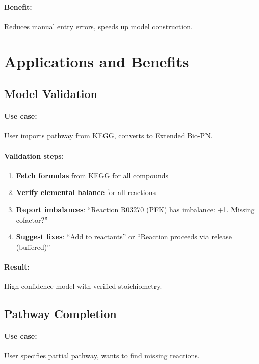 \paragraph{Benefit:} Reduces manual entry errors, speeds up model construction.

\section{Applications and Benefits}
\label{sec:formula-applications}

\subsection{Model Validation}
\label{subsec:model-validation}

\paragraph{Use case:} User imports pathway from KEGG, converts to Extended Bio-PN.

\paragraph{Validation steps:}
\begin{enumerate}
    \item \textbf{Fetch formulas} from KEGG for all compounds
    \item \textbf{Verify elemental balance} for all reactions
    \item \textbf{Report imbalances}: ``Reaction R03270 (PFK) has  imbalance: +1. Missing cofactor?''
    \item \textbf{Suggest fixes}: ``Add  to reactants'' or ``Reaction proceeds via  release (buffered)''
\end{enumerate}

\paragraph{Result:} High-confidence model with verified stoichiometry.

\subsection{Pathway Completion}
\label{subsec:pathway-completion}

\paragraph{Use case:} User specifies partial pathway, wants to find missing reactions.

